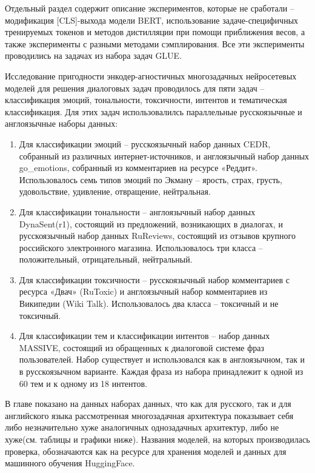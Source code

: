 Отдельный раздел содержит описание экспериментов, которые не сработали -- модификация [CLS]-выхода модели BERT, использование задаче-специфичных тренируемых токенов и методов дистилляции при помощи приближения весов, а также эксперименты с разными методами сэмплирования. Все эти эксперименты проводились на задачах из набора задач GLUE.

Исследование пригодности энкодер-агностичных многозадачных нейросетевых моделей для решения диалоговых задач проводилось для пяти задач -- классификация эмоций, тональности, токсичности, интентов и тематическая классификация. Для этих задач использовалилсь параллельные русскоязычные и англоязычные наборы данных:
\begin{enumerate}
    \item Для классификации эмоций -- русскоязычный набор данных CEDR, собранный из различных интернет-источников, и англоязычный набор данных go\_emotions, собранный из комментариев на ресурсе «Реддит». Использовалось семь типов эмоций по Экману -- ярость, страх, грусть, удовольствие, удивление, отвращение, нейтральная.
    \item Для классификации тональности -- англоязычный набор данных DynaSent(r1), состоящий из предложений, возникающих в диалогах, и русскоязычный набор данных RuReviews, состоящий из отзывов крупного российского электронного магазина. Использовалось три класса -- положительный, отрицательный, нейтральный.
    \item Для классификации токсичности -- русскоязычный набор комментариев с ресурса «Двач» (RuToxic) и англоязычный набор комментариев из Википедии (Wiki Talk). Использовалось два класса -- токсичный и не токсичный.
    \item Для классификации тем и классификации интентов -- набор данных MASSIVE, состоящий из обращенных к диалоговой системе фраз пользователей. Набор существует и использовался как в англоязычном, так и в русскоязычном варианте. Каждая фраза из набора принадлежит к одной из 60 тем и к одному из 18 интентов.
    
\end{enumerate}

В главе показано на данных наборах данных, что как для русского, так и для английского языка рассмотренная многозадачная архитектура показывает себя либо незначительно хуже аналогичных однозадачных архитектур, либо не хуже(см. таблицы и графики ниже). Названия моделей, на которых производилась проверка, обозначаются как на ресурсе для хранения моделей и данных для машинного обучения HuggingFace.

